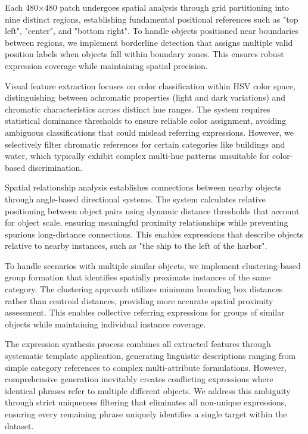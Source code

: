 Each 480×480 patch undergoes spatial analysis through grid partitioning into nine distinct regions, establishing fundamental positional references such as "top left", "center", and "bottom right". To handle objects positioned near boundaries between regions, we implement borderline detection that assigns multiple valid position labels when objects fall within boundary zones. This ensures robust expression coverage while maintaining spatial precision.

Visual feature extraction focuses on color classification within HSV color space, distinguishing between achromatic properties (light and dark variations) and chromatic characteristics across distinct hue ranges. The system requires statistical dominance thresholds to ensure reliable color assignment, avoiding ambiguous classifications that could mislead referring expressions. However, we selectively filter chromatic references for certain categories like buildings and water, which typically exhibit complex multi-hue patterns unsuitable for color-based discrimination.

Spatial relationship analysis establishes connections between nearby objects through angle-based directional systems. The system calculates relative positioning between object pairs using dynamic distance thresholds that account for object scale, ensuring meaningful proximity relationships while preventing spurious long-distance connections. This enables expressions that describe objects relative to nearby instances, such as "the ship to the left of the harbor".

To handle scenarios with multiple similar objects, we implement clustering-based group formation that identifies spatially proximate instances of the same category. The clustering approach utilizes minimum bounding box distances rather than centroid distances, providing more accurate spatial proximity assessment. This enables collective referring expressions for groups of similar objects while maintaining individual instance coverage.

The expression synthesis process combines all extracted features through systematic template application, generating linguistic descriptions ranging from simple category references to complex multi-attribute formulations. However, comprehensive generation inevitably creates conflicting expressions where identical phrases refer to multiple different objects. We address this ambiguity through strict uniqueness filtering that eliminates all non-unique expressions, ensuring every remaining phrase uniquely identifies a single target within the dataset.

